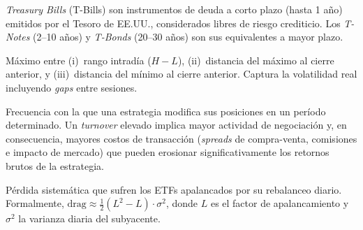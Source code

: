 \begin{description}[style=nextline, leftmargin=1.5cm]
\item[\hypertarget{glos:treasury}{T-Bills / T-Notes / T-Bonds}]
\textit{Treasury Bills} (T-Bills) son instrumentos de deuda a corto plazo (hasta 1 a\~no) emitidos por el Tesoro de EE.UU., considerados libres de riesgo crediticio. Los \textit{T-Notes} (2--10 a\~nos) y \textit{T-Bonds} (20--30 a\~nos) son sus equivalentes a mayor plazo.

\item[\hypertarget{glos:true_range}{\textit{True Range}}]
M\'aximo entre (i)~rango intrad\'ia ($H - L$), (ii)~distancia del m\'aximo al cierre anterior, y (iii)~distancia del m\'inimo al cierre anterior. Captura la volatilidad real incluyendo \textit{gaps} entre sesiones.

\item[\hypertarget{glos:turnover}{\textit{Turnover}}]
Frecuencia con la que una estrategia modifica sus posiciones en un per\'iodo determinado. Un \textit{turnover} elevado implica mayor actividad de negociaci\'on y, en consecuencia, mayores costos de transacci\'on (\textit{spreads} de compra-venta, comisiones e impacto de mercado) que pueden erosionar significativamente los retornos brutos de la estrategia.

\item[\hypertarget{glos:vol_drag}{\textit{Volatility drag}}]
P\'erdida sistem\'atica que sufren los ETFs apalancados por su rebalanceo diario. Formalmente, $\text{drag} \approx \frac{1}{2}(L^2 - L) \cdot \sigma^2$, donde $L$ es el factor de apalancamiento y $\sigma^2$ la varianza diaria del subyacente.

\end{description}
